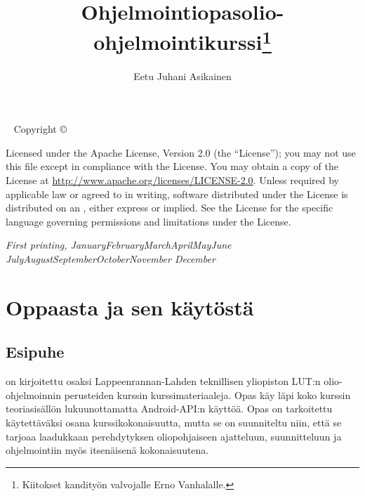 \documentclass[a4paper,justified,notoc]{tufte-book}
\title{Ohjelmointiopas{\small \lutin olio-ohjelmointikurssi}\thanks{Kiitokset kandityön valvojalle
Erno Vanhalalle.}}
\author[Eetu Juhani Asikainen]{Eetu Juhani Asikainen}
\newcommand{\lutin}{Lappeenrannan-Lahden teknillisen yliopiston LUT:n }
\newcommand{\monthyear}{
  \ifcase\month\or January\or February\or March\or April\or May\or June\or
  July\or August\or September\or October\or November\or
  December\fi\space\number\year
}
\begin{document}
\frontmatter

\maketitle

\newpage
\begin{fullwidth}
~\vfill
\thispagestyle{empty}
\setlength{\parindent}{0pt}
\setlength{\parskip}{\baselineskip}
Copyright \copyright\ \the\year\ \thanklessauthor

\par{}

\par{}

\par Licensed under the Apache License, Version 2.0 (the ``License''); you may not
use this file except in compliance with the License. You may obtain a copy
of the License at \url{http://www.apache.org/licenses/LICENSE-2.0}. Unless
required by applicable law or agreed to in writing, software distributed
under the License is distributed on an , either express or implied. See the
License for the specific language governing permissions and limitations
under the License.

\par\textit{First printing, \monthyear}

\tableofcontents
\listoflistings


\chapter{Oppaasta ja sen käytöstä}
\label{oppaasta}


\section{Esipuhe}
\label{esipuhe}

 on kirjoitettu osaksi \lutin olio-ohjelmoinnin perusteiden kurssin
kurssimateriaaleja. Opas käy läpi koko kurssin  teoriasisällön lukuunottamatta Android-API:n
käyttöä. Opas on tarkoitettu käytettäväksi osana kurssikokonaisuutta, mutta se on suunniteltu
niin, että se tarjoaa laadukkaan perehdytyksen oliopohjaiseen ajatteluun, suunnitteluun ja
ohjelmointiin myös itsenäisenä kokonaisuutena.


\end{fullwidth}
\end{document}
